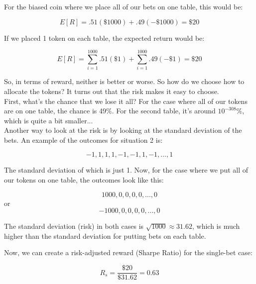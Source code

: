 \noindent For the biased coin where we place all of our bets on one table, this would be:

\begin{equation*}
	E[R] = .51(\$1000) + .49(-\$1000) = \$20
\end{equation*}

\noindent If we placed 1 token on each table, the expected return would be:

\begin{equation*}
	E[R] = \sum_{i=1}^{1000} .51(\$1) + \sum_{i=1}^{1000} .49(-\$1) = \$20
\end{equation*}

\noindent So, in terms of reward, neither is better or worse. So how do we choose how to allocate the tokens? It turns out that the risk makes it easy to choose.\\

\noindent First, what's the chance that we lose it all? For the case where all of our tokens are on one table, the chance is 49\%. For the second table, it's around $10^{-308}\%$, which is quite a bit smaller...\\

\noindent Another way to look at the risk is by looking at the standard deviation of the bets. An example of the outcomes for situation 2 is:

\begin{equation*}
	-1,1,1,1,-1,-1,1,-1,...,1
\end{equation*}

\noindent The standard deviation of which is just 1. Now, for the case where we put all of our tokens on one table, the outcomes look like this:

\begin{equation*}
	1000,0,0,0,0,...,0
\end{equation*}
or
\begin{equation*}
	-1000,0,0,0,0,...,0
\end{equation*}

\noindent The standard deviation (risk) in both cases is $\sqrt{1000} \approx 31.62$, which is much higher than the standard deviation for putting bets on each table.

\noindent Now, we can create a risk-adjusted reward (Sharpe Ratio) for the single-bet case:

\begin{equation*}
	R_{s} = \frac{\$20}{\$31.62} = 0.63
\end{equation*}

